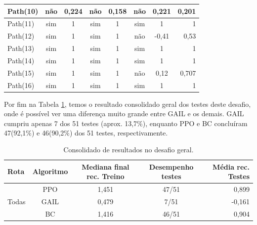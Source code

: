 \begin{table}[htpb]
\begin{tabular}{|l|c|c|c|c|c|c|r|}
            Path(10)  &      não        &   0,224         &    não          &      0,158    &    não          &      0,221    &      0,201             \\ \hline
            Path(11)  &      sim        &   1             &    sim          &      1        &    sim          &      1        &      1                 \\ \hline
            Path(12)  &      sim        &   1             &    sim          &      1        &    não          &      -0,41    &      0,53              \\ \hline
            Path(13)  &      sim        &   1             &    sim          &      1        &    sim          &      1        &      1                 \\ \hline
            Path(14)  &      sim        &   1             &    sim          &      1        &    sim          &      1        &      1                 \\ \hline
            Path(15)  &      sim        &   1             &    sim          &      1        &    não          &      0,12     &      0,707             \\ \hline
            Path(16)  &      sim        &   1             &    sim          &      1        &    sim          &      1        &      1                 \\ \hline
    \end{tabular}
\end{table}

Por fim na Tabela \ref{resultado-tabela-desafio-geral}, temos o resultado consolidado geral dos testes deste desafio, onde é possível ver uma diferença muito grande entre GAIL e os demais. GAIL cumpriu apenas 7 dos 51 testes (aprox. 13,7\%), enquanto PPO e BC concluíram 47(92,1\%) e 46(90,2\%) dos 51 testes, respectivamente. 

\begin{table}[htpb]
    \centering
    \caption{Consolidado de resultados no desafio geral.}
    \label{resultado-tabela-desafio-geral}
    \begin{tabular}{|l|c|c|c|r|}
         \hline
         \small{Rota}           & \small{Algoritmo}   & \small{Mediana final rec. Treino}  & \small{Desempenho testes}    & \small{Média rec. Testes} \\ \hline
         \multirow{3}{*}{Todas} &      PPO            &   1,451                            &    47/51                     &      0,899                \\ \cline{2-5}
                                &      GAIL           &   0,479                            &    7/51                      &      -0,161               \\ \cline{2-5}
                                &      BC             &   1,416                            &    46/51                     &      0,904                \\ \hline
    \end{tabular}
\end{table}